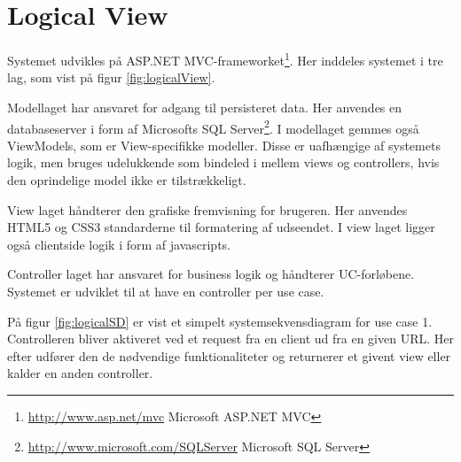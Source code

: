\section{Logical View}\label{sec:LogicalView}
Systemet udvikles på ASP.NET MVC-frameworket\footnote{\url{http://www.asp.net/mvc} Microsoft ASP.NET MVC}. Her inddeles systemet i tre lag, som vist på figur \ref{fig:logicalView}.


Modellaget har ansvaret for adgang til persisteret data. Her anvendes en databaseserver i form af Microsofts SQL Server\footnote{\url{http://www.microsoft.com/SQLServer} Microsoft SQL Server}. I modellaget gemmes også ViewModels, som er View-specifikke modeller. Disse er uafhængige af systemets logik, men bruges udelukkende som bindeled i mellem views og controllers, hvis den oprindelige model ikke er tilstrækkeligt.

View laget håndterer den grafiske fremvisning for brugeren. Her anvendes HTML5 og CSS3 standarderne til formatering af udseendet. I view laget ligger også clientside logik i form af javascripts.

Controller laget har ansvaret for business logik og håndterer UC-forløbene. Systemet er udviklet til at have en controller per use case.

På figur \ref{fig:logicalSD} er vist et simpelt systemsekvensdiagram for use case 1. Controlleren bliver aktiveret ved et request fra en client ud fra en given URL. Her efter udfører den de nødvendige funktionaliteter og returnerer et givent view eller kalder en anden controller.

